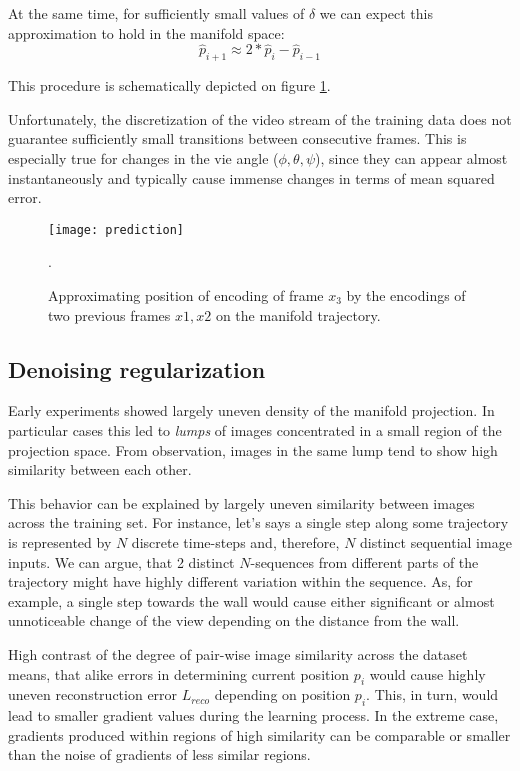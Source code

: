 At the same time, for sufficiently small values of $\delta$ we can expect this approximation to hold in the manifold space:
\begin{equation}
  \hat{p}_{i+1} \approx 2*\hat{p}_i - \hat{p}_{i-1}
\end{equation}

This procedure is schematically depicted on figure \ref{fig:m_pred}.

Unfortunately, the discretization of the video stream of the training data does not guarantee sufficiently small transitions between consecutive frames.
This is especially true for changes in the vie angle ($\phi, \theta, \psi$), since they can appear almost instantaneously and typically cause immense changes in terms of mean squared error.

\begin{figure}[h!]
  \centering
    \texttt{[image: prediction]}
  \caption{Approximating position of encoding of frame $x_3$ by the encodings of two previous frames $x1, x2$ on the manifold trajectory.}.
  \label{fig:m_pred}
\end{figure}


\subsection{Denoising regularization}

Early experiments showed largely uneven density of the manifold projection.
In particular cases this led to \textit{lumps} of images concentrated in a small region of the projection space.
From observation, images in the same lump tend to show high similarity between each other.

This behavior can be explained by largely uneven similarity between images across the training set.
For instance, let's says a single step along some trajectory is represented by $N$ discrete time-steps and, therefore, $N$ distinct sequential image inputs.
We can argue, that 2 distinct $N$-sequences from different parts of the trajectory might have highly different variation within the sequence.
As, for example, a single step towards the wall would cause either significant or almost unnoticeable change of the view depending on the distance from the wall.

High contrast of the degree of pair-wise image similarity across the dataset means, that alike errors in determining current position $p_i$ would cause highly uneven reconstruction error $L_{reco}$ depending on position $p_i$.
This, in turn, would lead to smaller gradient values during the learning process.
In the extreme case, gradients produced within regions of high similarity can be comparable or smaller than the noise of gradients of less similar regions.

